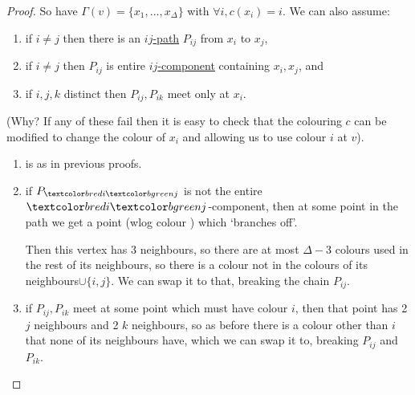 \documentclass{article}
\begin{document}
\begin{proof}
    So have $\Gamma(v) = \{x_1, ..., x_\Delta\}$ with $\forall i, c(x_i) = i$.
    We can also assume:
    \begin{enumerate}[label=(\roman*)]
        \item if $i \neq j$ then there is an \hyperlink{def:ijpath}{$ij$-path} $P_{ij}$ from $x_i$ to $x_j$,
        \item if $i \neq j$ then $P_{ij}$ is entire \hyperlink{def:ijcomp}{$ij$-component} containing $x_i,x_j$, and
        \item if $i, j, k$ distinct then $P_{ij}, P_{ik}$ meet only at $x_i$.
    \end{enumerate}
    (Why? If any of these fail then it is easy to check that the colouring $c$ can be modified to change the colour of $x_i$ and allowing us to use colour $i$ at $v$).
    \begin{enumerate}[label=(\roman*)]
        \item is as in previous proofs.
        \item if $P_{\red{i}\green{j}}$ is not the entire $\red{i}\green{j}$-component, then
            at some point in the path we get a point (wlog colour ) which `branches off'.
            \begin{center}
            \end{center}
            Then this vertex has 3  neighbours, so there are at most $\Delta - 3$ colours used in the rest of its neighbours, so there is a colour not in the colours of its neighbours$\cup \{i,j\}$.
            We can swap it to that, breaking the chain $P_{ij}$.
        \item if $P_{ij}, P_{ik}$ meet at some point which must have colour $i$, then that point has 2 $j$ neighbours and 2 $k$ neighbours, so as before there is a colour other than $i$ that none of its neighbours have, which we can swap it to, breaking $P_{ij}$ and $P_{ik}$.
    \end{enumerate}


\end{proof}
\end{document}
